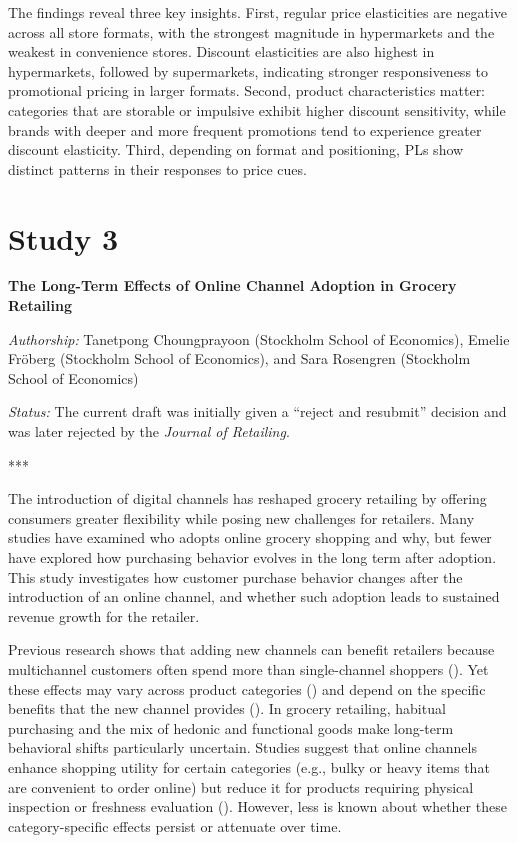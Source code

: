 The findings reveal three key insights. First, regular price elasticities are negative across all store formats, with the strongest magnitude in hypermarkets and the weakest in convenience stores. Discount elasticities are also highest in hypermarkets, followed by supermarkets, indicating stronger responsiveness to promotional pricing in larger formats. Second, product characteristics matter: categories that are storable or impulsive exhibit higher discount sensitivity, while brands with deeper and more frequent promotions tend to experience greater discount elasticity. Third, depending on format and positioning, PLs show distinct patterns in their responses to price cues.



\section{Study 3}

\textbf{The Long-Term Effects of Online Channel Adoption in Grocery Retailing}

\noindent
\textit{Authorship:} Tanetpong Choungprayoon (Stockholm School of Economics), Emelie Fröberg (Stockholm School of Economics), and Sara Rosengren (Stockholm School of Economics)

\noindent
\textit{Status:} The current draft was initially given a “reject and resubmit” decision and was later rejected by the \textit{Journal of Retailing}.

\noindent
***

The introduction of digital channels has reshaped grocery retailing by offering consumers greater flexibility while posing new challenges for retailers. Many studies have examined who adopts online grocery shopping and why, but fewer have explored how purchasing behavior evolves in the long term after adoption. This study investigates how customer purchase behavior changes after the introduction of an online channel, and whether such adoption leads to sustained revenue growth for the retailer.

Previous research shows that adding new channels can benefit retailers because multichannel customers often spend more than single-channel shoppers (\cite{Ansari2008-qz,Kumar2005-nn}). Yet these effects may vary across product categories (\cite{Kushwaha2013-iu}) and depend on the specific benefits that the new channel provides (\cite{Bell2018-yn,Melis2016-mf}). In grocery retailing, habitual purchasing and the mix of hedonic and functional goods make long-term behavioral shifts particularly uncertain. Studies suggest that online channels enhance shopping utility for certain categories (e.g., bulky or heavy items that are convenient to order online) but reduce it for products requiring physical inspection or freshness evaluation (\cite{Campo2015-pt,Campo2020-xu}). However, less is known about whether these category-specific effects persist or attenuate over time.

